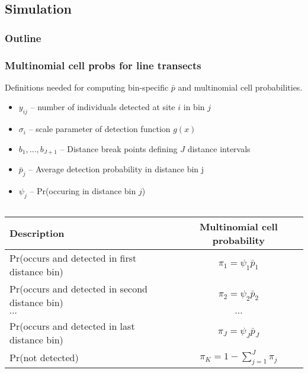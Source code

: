 \documentclass[color=usenames,dvipsnames]{beamer}\usepackage[]{graphicx}\usepackage[]{xcolor}
\begin{document}
\subsection{Simulation}

\begin{frame}
  \frametitle{Outline}
  \Large
  \tableofcontents[currentsection]
\end{frame}



\begin{frame}
  \frametitle{Multinomial cell probs for line transects}
  \small
  Definitions needed for computing \alert{bin-specific} $\bar{p}$ and
  multinomial cell probabilities. 
  \begin{itemize}
  \small
    \setlength\itemsep{1pt}
    \item $y_{ij}$ -- number of individuals detected at site $i$ in bin $j$
    \item $\sigma_i$ -- scale parameter of detection function $g(x)$
    \item $b_1, \dots, b_{J+1}$ -- Distance break points defining $J$ distance intervals
    \item $\bar{p}_j$ -- Average detection probability in distance bin j
    \item $\psi_j$ -- Pr(occuring in distance bin $j$)
  \end{itemize}
  \pause \vfill
  \footnotesize
  \begin{columns}
    \column{0.9\paperwidth}
    \begin{tabular}{lc}
      \hline
      \centering
      Description                       & Multinomial cell probability \\
      \hline
      Pr(occurs and detected in first distance bin)  & $\pi_1 = \psi_1\bar{p}_1$   \\
      Pr(occurs and detected in second distance bin)  & $\pi_2 = \psi_2\bar{p}_2$   \\
      {\centering $\cdots$}             & $\cdots$                     \\
      Pr(occurs and detected in last distance bin)  & $\pi_J = \psi_J\bar{p}_J$   \\
      Pr(not detected)                  & $\pi_{K} = 1-\sum_{j=1}^J \pi_j$          \\
      \hline
    \end{tabular}
  \end{columns}
\end{frame}
\end{document}
